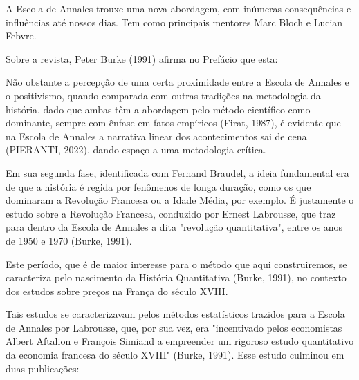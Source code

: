 A Escola de Annales trouxe uma nova abordagem, com inúmeras consequências e influências até nossos dias. Tem como principais mentores  Marc Bloch e Lucian Febvre.

Sobre a revista, Peter Burke (1991) afirma no Prefácio que esta:


\noindent\begin{center}\mbox{\centering{}}\end{center}


Não obstante a percepção de uma certa proximidade entre a Escola de Annales e o positivismo, quando comparada com outras tradições na metodologia da história, dado que ambas têm a abordagem pelo método científico como dominante, sempre com ênfase em fatos empíricos (Firat, 1987), é evidente que na Escola de Annales a narrativa linear dos acontecimentos sai de cena (PIERANTI, 2022), dando espaço a uma metodologia crítica.

Em sua segunda fase, identificada com Fernand Braudel, a ideia fundamental era de que a história é regida por fenômenos de longa duração, como os que dominaram a Revolução Francesa ou a Idade Média, por exemplo. É justamente o estudo sobre a Revolução Francesa, conduzido por Ernest Labrousse, que traz para dentro da Escola de Annales a dita "revolução quantitativa", entre os anos de 1950 e 1970  (Burke, 1991).

Este período, que é de maior interesse para o método que aqui construiremos, se caracteriza pelo nascimento da História Quantitativa (Burke, 1991), no contexto dos estudos sobre preços na França do século XVIII.

Tais estudos se caracterizavam pelos métodos estatísticos trazidos para a Escola de Annales por Labrousse, que, por sua vez, era "incentivado pelos economistas Albert Aftalion e François Simiand a empreender um rigoroso estudo quantitativo da economia francesa do século XVIII"  (Burke, 1991). Esse estudo culminou em duas publicações:


